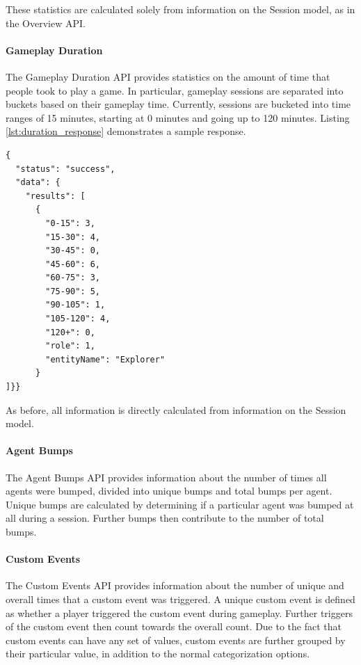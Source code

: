 These statistics are calculated solely from information on the Session model, as in the Overview API.

\paragraph{Gameplay Duration}

The Gameplay Duration API provides statistics on the amount of time that people took to play a game. In particular, gameplay sessions are separated into buckets based on their gameplay time. Currently, sessions are bucketed into time ranges of 15 minutes, starting at 0 minutes and going up to 120 minutes. Listing \ref{lst:duration_response} demonstrates a sample response.
\medskip
\begin{lstlisting}[caption={[Gameplay Duration API Response Example]Gameplay Duration API response{,} showing the number of sessions that fell within certain ranges of gameplay time{,} categorized by the Explorer role}, label={lst:duration_response}]
{
  "status": "success",
  "data": {
    "results": [
      {
        "0-15": 3,
        "15-30": 4,
        "30-45": 0,
        "45-60": 6,
        "60-75": 3,
        "75-90": 5,
        "90-105": 1,
        "105-120": 4,
        "120+": 0,
        "role": 1,
        "entityName": "Explorer"
      }
]}}
\end{lstlisting}

As before, all information is directly calculated from information on the Session model.

\paragraph{Agent Bumps}

The Agent Bumps API provides information about the number of times all agents were bumped, divided into unique bumps and total bumps per agent. Unique bumps are calculated by determining if a particular agent was bumped at all during a session. Further bumps then contribute to the number of total bumps. 

\paragraph{Custom Events}

The Custom Events API provides information about the number of unique and overall times that a custom event was triggered. A unique custom event is defined as whether a player triggered the custom event during gameplay. Further triggers of the custom event then count towards the overall count. Due to the fact that custom events can have any set of values, custom events are further grouped by their particular value, in addition to the normal categorization options.

